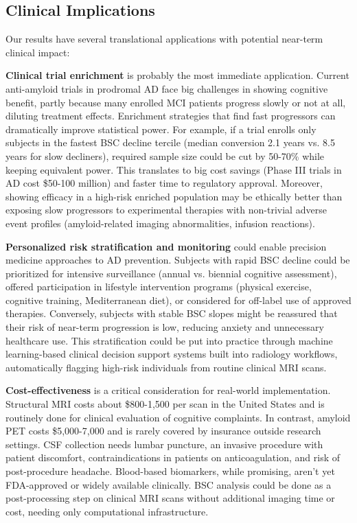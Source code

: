 \documentclass[blue]{ludusofficial}  %
\begin{document}
\subsection{Clinical Implications}

Our results have several translational applications with potential near-term clinical impact:

\textbf{Clinical trial enrichment} is probably the most immediate application. Current anti-amyloid trials in prodromal AD face big challenges in showing cognitive benefit, partly because many enrolled MCI patients progress slowly or not at all, diluting treatment effects. Enrichment strategies that find fast progressors can dramatically improve statistical power. For example, if a trial enrolls only subjects in the fastest BSC decline tercile (median conversion 2.1 years vs. 8.5 years for slow decliners), required sample size could be cut by 50-70\% while keeping equivalent power. This translates to big cost savings (Phase III trials in AD cost \$50-100 million) and faster time to regulatory approval. Moreover, showing efficacy in a high-risk enriched population may be ethically better than exposing slow progressors to experimental therapies with non-trivial adverse event profiles (amyloid-related imaging abnormalities, infusion reactions).

\textbf{Personalized risk stratification and monitoring} could enable precision medicine approaches to AD prevention. Subjects with rapid BSC decline could be prioritized for intensive surveillance (annual vs. biennial cognitive assessment), offered participation in lifestyle intervention programs (physical exercise, cognitive training, Mediterranean diet), or considered for off-label use of approved therapies. Conversely, subjects with stable BSC slopes might be reassured that their risk of near-term progression is low, reducing anxiety and unnecessary healthcare use. This stratification could be put into practice through machine learning-based clinical decision support systems built into radiology workflows, automatically flagging high-risk individuals from routine clinical MRI scans.

\textbf{Cost-effectiveness} is a critical consideration for real-world implementation. Structural MRI costs about \$800-1,500 per scan in the United States and is routinely done for clinical evaluation of cognitive complaints. In contrast, amyloid PET costs \$5,000-7,000 and is rarely covered by insurance outside research settings. CSF collection needs lumbar puncture, an invasive procedure with patient discomfort, contraindications in patients on anticoagulation, and risk of post-procedure headache. Blood-based biomarkers, while promising, aren't yet FDA-approved or widely available clinically. BSC analysis could be done as a post-processing step on clinical MRI scans without additional imaging time or cost, needing only computational infrastructure.
\end{document}
